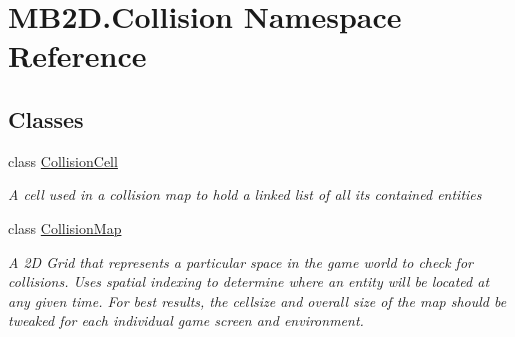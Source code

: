 \hypertarget{namespace_m_b2_d_1_1_collision}{}\section{M\+B2\+D.\+Collision Namespace Reference}
\label{namespace_m_b2_d_1_1_collision}
\subsection*{Classes}
\begin{DoxyCompactItemize}
\item 
class \hyperlink{class_m_b2_d_1_1_collision_1_1_collision_cell}{Collision\+Cell}
\begin{DoxyCompactList}\small\item\em A cell used in a collision map to hold a linked list of all its contained entities \end{DoxyCompactList}\item 
class \hyperlink{class_m_b2_d_1_1_collision_1_1_collision_map}{Collision\+Map}
\begin{DoxyCompactList}\small\item\em A 2D Grid that represents a particular space in the game world to check for collisions. Uses spatial indexing to determine where an entity will be located at any given time. For best results, the cellsize and overall size of the map should be tweaked for each individual game screen and environment. \end{DoxyCompactList}\end{DoxyCompactItemize}
